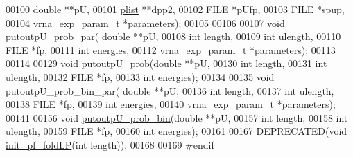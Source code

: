 \begin{DoxyCode}
00100                     \textcolor{keywordtype}{double} **pU,
00101                     \hyperlink{group__data__structures_structvrna__plist__s}{plist} **dpp2,
00102                     FILE *pUfp,
00103                     FILE *spup,
00104                     \hyperlink{group__energy__parameters_structvrna__exp__param__s}{vrna\_exp\_param\_t} *parameters);
00105 
00106 
00107 \textcolor{keywordtype}{void} putoutpU\_prob\_par( \textcolor{keywordtype}{double} **pU,
00108                         \textcolor{keywordtype}{int} length,
00109                         \textcolor{keywordtype}{int} ulength,
00110                         FILE *fp,
00111                         \textcolor{keywordtype}{int} energies,
00112                         \hyperlink{group__energy__parameters_structvrna__exp__param__s}{vrna\_exp\_param\_t} *parameters);
00113 
00114 
00129 \textcolor{keywordtype}{void}    \hyperlink{group__local__pf__fold_ga0bcb751860bbf34e3dfee8c2fbdb3ef3}{putoutpU\_prob}(\textcolor{keywordtype}{double} **pU,
00130                       \textcolor{keywordtype}{int} length,
00131                       \textcolor{keywordtype}{int} ulength,
00132                       FILE *fp,
00133                       \textcolor{keywordtype}{int} energies);
00134 
00135 \textcolor{keywordtype}{void} putoutpU\_prob\_bin\_par( \textcolor{keywordtype}{double} **pU,
00136                             \textcolor{keywordtype}{int} length,
00137                             \textcolor{keywordtype}{int} ulength,
00138                             FILE *fp,
00139                             \textcolor{keywordtype}{int} energies,
00140                             \hyperlink{group__energy__parameters_structvrna__exp__param__s}{vrna\_exp\_param\_t} *parameters);
00141 
00156 \textcolor{keywordtype}{void}    \hyperlink{group__local__pf__fold_ga9acb00ee10e96b1ca4ea394cd8bcec75}{putoutpU\_prob\_bin}(\textcolor{keywordtype}{double} **pU,
00157                           \textcolor{keywordtype}{int} length,
00158                           \textcolor{keywordtype}{int} ulength,
00159                           FILE *fp,
00160                           \textcolor{keywordtype}{int} energies);
00161 
00167 DEPRECATED(\textcolor{keywordtype}{void} \hyperlink{LPfold_8h_ae85bf55053e9fb295208be322e0fa07a}{init\_pf\_foldLP}(\textcolor{keywordtype}{int} length));
00168 
00169 \textcolor{preprocessor}{#endif}
\end{DoxyCode}
